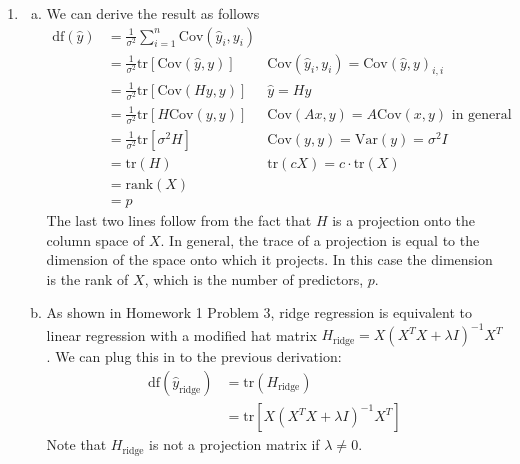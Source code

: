 \documentclass[10pt]{article}
\newcommand{\1}{\mathbbm{1}}
\newcommand{\V}{\text{Var}}
\newcommand{\C}{\text{Cov}}
\begin{document}
\begin{enumerate}
\item 

\begin{enumerate}[(a)]
\item We can derive the result as follows
\begin{align*}
\text{df}(\hat y) &= \frac{1}{\sigma^2} \sum_{i=1}^n \C(\hat{y}_i,y_i) & \\
&= \frac{1}{\sigma^2} \text{tr}\left[\C(\hat{y},y)\right] & \C(\hat{y}_i,y_i)=\C(\hat{y},y)_{i,i}\\
&= \frac{1}{\sigma^2} \text{tr}\left[\C(Hy,y)\right] & \hat{y} = Hy\\
&= \frac{1}{\sigma^2} \text{tr}\left[H\C(y,y)\right] & \C(Ax,y) = A\C(x,y) \text{ in general}\\
&= \frac{1}{\sigma^2} \text{tr}\left[\sigma^2 H\right] & \C(y,y) = \V(y) = \sigma^2 I\\
&= \text{tr}(H) & \text{tr}(cX) = c\cdot\text{tr}(X)\\
&= \text{rank}(X) &\\
&= p &
\end{align*}
The last two lines follow from the fact that $H$ is a projection onto the column space of $X$. In general, the trace of a projection is equal to the dimension of the space onto which it projects. In this case the dimension is the rank of $X$, which is the number of predictors, $p$.
\item As shown in Homework 1 Problem 3, ridge regression is equivalent to linear regression with a modified hat matrix $H_{\text{ridge}} = X(X^TX+\lambda I)^{-1}X^T$. We can plug this in to the previous derivation:
\begin{align*}
\text{df}(\hat{y}_\text{ridge}) &= \text{tr}(H_\text{ridge}) \\
&=  \text{tr}\left[ X(X^TX+\lambda I)^{-1}X^T\right]
\end{align*}
Note that $H_\text{ridge}$ is not a projection matrix if $\lambda \neq 0$.
\end{enumerate}



\end{enumerate}
\end{document}
